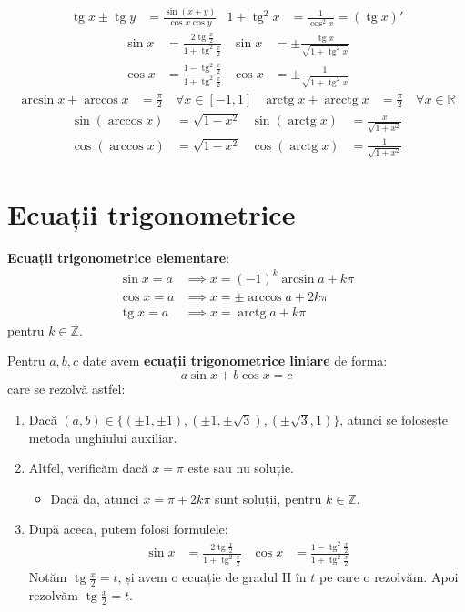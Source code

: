 \documentclass{article}
\DeclareMathOperator{\tg}{tg}
\DeclareMathOperator{\arctg}{arctg}
\DeclareMathOperator{\arcctg}{arcctg}
\begin{document}
\begin{align*}
    \tg x \pm \tg y &= \frac{\sin(x\pm y)}{\cos x \cos y} &
    1 + \tg^2 x &= \frac{1}{\cos^2 x} = (\tg x)'
\end{align*}
\begin{align*}
    \sin x &= \frac{2\tg \frac{x}{2}}{1 + \tg^2 \frac{x}{2}} &
    \sin x &= \pm \frac{\tg x}{\sqrt{1+\tg^2 x}} \\
    \cos x &= \frac{1 - \tg^2 \frac{x}{2}}{1 + \tg^2 \frac{x}{2}} &
    \cos x &= \pm \frac{1}{\sqrt{1+\tg^2 x}}
\end{align*}
\begin{align*}
    \arcsin x + \arccos x &= \frac{\pi}{2}\quad \forall x \in [-1, 1] &
    \arctg x + \arcctg x &= \frac{\pi}{2}\quad \forall x \in \mathbb{R}
\end{align*}
\begin{align*}
    \sin(\arccos x) &= \sqrt{1-x^2} &
    \sin(\arctg x) &= \frac{x}{\sqrt{1+x^2}} \\
    \cos(\arccos x) &= \sqrt{1-x^2} &
    \cos(\arctg x) &= \frac{1}{\sqrt{1+x^2}}
\end{align*}
\section*{Ecuații trigonometrice}
\begin{minipage}{\textwidth}
\textbf{Ecuații trigonometrice elementare}:
\begin{align*}
\sin x = a &\implies x = (-1)^k \arcsin a + k\pi \\
\cos x = a &\implies x = \pm \arccos a + 2k\pi \\
\tg x = a &\implies x = \arctg a + k\pi
\end{align*}
pentru $k \in \mathbb{Z}$.
\end{minipage}

Pentru $a, b, c$ date avem \textbf{ecuații trigonometrice liniare} de forma:
\begin{equation*}
    a\sin x + b\cos x = c
\end{equation*}
care se rezolvă astfel:
\begin{enumerate}
    \item Dacă $(a, b) \in \{(\pm 1, \pm 1), (\pm 1, \pm \sqrt{3}), (\pm \sqrt{3}, 1)\}$, atunci se folosește metoda unghiului auxiliar.
    \item Altfel, verificăm dacă $x=\pi$ este sau nu soluție.
    \begin{itemize}
        \item Dacă da, atunci $x = \pi + 2k\pi$ sunt soluții, pentru $k \in \mathbb{Z}$.
    \end{itemize}
    \item După aceea, putem folosi formulele:
    \begin{align*}
        \sin x &= \frac{2\tg \frac{x}{2}}{1 + \tg^2 \frac{x}{2}} &
        \cos x &= \frac{1 - \tg^2 \frac{x}{2}}{1 + \tg^2 \frac{x}{2}}
    \end{align*}
    Notăm $\tg \frac{x}{2} = t$, și avem o ecuație de gradul II în $t$ pe care o rezolvăm. Apoi rezolvăm $\tg \frac{x}{2} = t$.
\end{enumerate}
\end{document}
